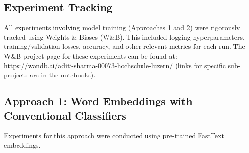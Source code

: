 \documentclass[10.5pt]{article}
\begin{document}
\subsection{Experiment Tracking}
All experiments involving model training (Approaches 1 and 2) were rigorously tracked using Weights \& Biases (W\&B). This included logging hyperparameters, training/validation losses, accuracy, and other relevant metrics for each run. The W\&B project page for these experiments can be found at: \url{https://wandb.ai/aditi-sharma-00073-hochschule-luzern/} (links for specific sub-projects are in the notebooks).

\subsection{Approach 1: Word Embeddings with Conventional Classifiers}
Experiments for this approach were conducted using pre-trained FastText embeddings.
\end{document}
